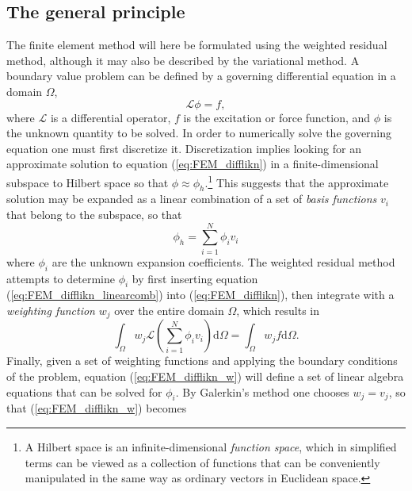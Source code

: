 \subsection{The general principle}
\label{sec:FEM_generalprinciple}
The finite element method will here be formulated using the weighted residual method, although it may also be described by the variational method\cite{FEM_in_EM_jianming_jin}. A boundary value problem can be defined by a governing differential equation in a domain $\Omega$,
\begin{equation}
    \mathcal{L}\phi = f,
    \label{eq:FEM_difflikn}
\end{equation}
where $\mathcal{L}$ is a differential operator, $f$ is the excitation or force function, and $\phi$ is the unknown quantity to be solved. In order to numerically solve the governing equation one must first discretize it. Discretization implies looking for an approximate solution to equation (\ref{eq:FEM_difflikn}) in a finite-dimensional subspace to Hilbert space so that $\phi\approx\phi_h$.\footnote{A Hilbert space is an infinite-dimensional \emph{function space}, which in simplified terms can be viewed as a collection of functions that can be conveniently manipulated in the same way as ordinary vectors in Euclidean space.} This suggests that the approximate solution may be expanded as a linear combination of a set of \emph{basis functions} $v_i$ that belong to the subspace, so that\cite{FEM_comsol}
\begin{equation}
    \phi_h = \sum_{i=1}^N \phi_i v_i
    \label{eq:FEM_difflikn_linearcomb}
\end{equation}
where $\phi_i$ are the unknown expansion coefficients. The weighted residual method attempts to determine $\phi_i$ by first inserting equation (\ref{eq:FEM_difflikn_linearcomb}) into (\ref{eq:FEM_difflikn}), then integrate with a \emph{weighting function} $w_j$ over the entire domain $\Omega$, which results in\cite{FEM_TheoryAndCompOfEM_Jian-Ming_Jin}
\begin{equation}
    \int_\Omega w_j \mathcal{L} \left( \sum_{i=1}^N \phi_i v_i \right) \text{d}\Omega = \int_\Omega w_j f \text{d}\Omega.
    \label{eq:FEM_difflikn_w}
\end{equation}
Finally, given a set of weighting functions and applying the boundary conditions of the problem, equation (\ref{eq:FEM_difflikn_w}) will define a set of linear algebra equations that can be solved for $\phi_i$. By Galerkin's method\cite{FEM_in_EM_jianming_jin} one chooses $w_j = v_j$, so that (\ref{eq:FEM_difflikn_w}) becomes 
